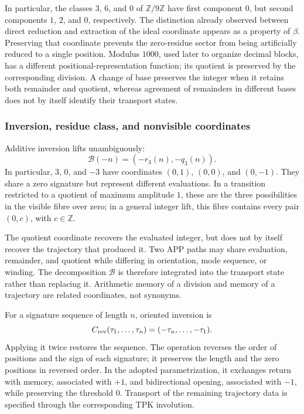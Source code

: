 In particular, the classes \(3\), \(6\), and \(0\) of
\(\mathbb Z/9\mathbb Z\) have first component \(0\), but second
components \(1\), \(2\), and \(0\), respectively. The distinction already observed
between direct reduction and extraction of the ideal coordinate appears
as a property of \(\beta\). Preserving that coordinate prevents the
zero-residue sector from being artificially reduced to a single position.
Modulus \(1000\), used later to organize decimal blocks,
has a different positional-representation function; its quotient is preserved
by the corresponding division. A change of base preserves the integer
when it retains both remainder and quotient, whereas agreement of remainders
in different bases does not by itself identify their transport states.

\subsubsection{Inversion, residue class, and nonvisible coordinates}
\label{trit-ampl-inversion}

Additive inversion lifts unambiguously:
\[
 \mathcal B(-n)=(-r_3(n),-q_3(n)).
\]
In particular, \(3\), \(0\), and \(-3\) have coordinates
\((0,1)\), \((0,0)\), and \((0,-1)\). They share a zero signature but represent
different evaluations. In a transition restricted to a quotient of
maximum amplitude \(1\), these are the three possibilities in the visible fibre over
zero; in a general integer lift, this fibre contains every pair
\((0,c)\), with \(c\in\mathbb Z\).

The quotient coordinate recovers the evaluated integer, but does not by
itself recover the trajectory that produced it. Two APP paths may share
evaluation, remainder, and quotient while differing in orientation, mode sequence, or
winding. The decomposition \(\mathcal B\) is therefore integrated into the
transport state rather than replacing it. Arithmetic memory of a
division and memory of a trajectory are related coordinates, not
synonyms.

For a signature sequence of length \(n\), oriented inversion is
\[
 C_{\rm rev}(\tau_1,\ldots,\tau_n)
   =(-\tau_n,\ldots,-\tau_1).
\]
Applying it twice restores the sequence. The operation reverses the order of
positions and the sign of each signature; it preserves the length and the
zero positions in reversed order. In the adopted parametrization,
it exchanges return with memory, associated with \(+1\), and bidirectional
opening, associated with \(-1\), while preserving the threshold \(0\). Transport
of the remaining trajectory data is specified through the
corresponding TPK involution.

